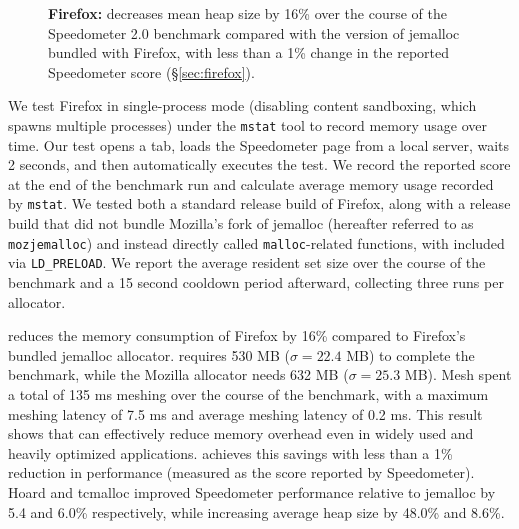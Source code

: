 \begin{figure}[t!]%
  \centering
  \caption{\textbf{Firefox:} \Mesh decreases mean heap size by 16\%
    over the course of the Speedometer 2.0 benchmark compared with the
    version of jemalloc bundled with Firefox, with less than a 1\%
    change in the reported Speedometer score (\S\ref{sec:firefox}).
    \label{fig:firefox-heap}}
\end{figure}

We test Firefox in single-process mode (disabling content sandboxing,
which spawns multiple processes) under the \texttt{mstat} tool to
record memory usage over time. Our test opens a tab, loads the
Speedometer page from a local server, waits 2 seconds, and then
automatically executes the test.  We record the reported score
at the end of the benchmark run and calculate average memory
usage recorded by \texttt{mstat}.  We tested both a standard release
build of Firefox, along with a release build that did not bundle
Mozilla's fork of jemalloc (hereafter referred to as
\texttt{mozjemalloc}) and instead directly called \texttt{malloc}-related
functions, with \Mesh included via \texttt{LD\_PRELOAD}.  We report
the average resident set size over the course of the benchmark and a
15 second cooldown period afterward, collecting three runs per
allocator.

\Mesh reduces the memory consumption of Firefox by 16\% compared to
Firefox's bundled jemalloc allocator. \Mesh requires 530 MB ($\sigma =
22.4$ MB) to complete the benchmark, while the Mozilla allocator needs
632 MB ($\sigma = 25.3$ MB). Mesh spent a total of 135 ms meshing over
the course of the benchmark, with a maximum meshing latency of 7.5 ms
and average meshing latency of 0.2 ms.  This result shows that \Mesh
can effectively reduce memory overhead even in widely used and heavily
optimized applications. \Mesh achieves this savings with less than a
1\% reduction in performance (measured as the score reported by
Speedometer).  Hoard and tcmalloc improved Speedometer performance
relative to jemalloc by 5.4 and 6.0\% respectively, while increasing
average heap size by 48.0\% and 8.6\%.

